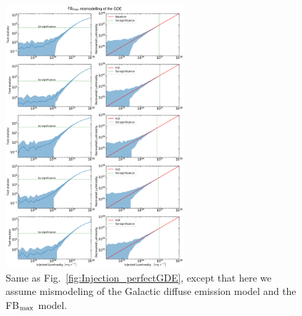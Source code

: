 \documentclass[doublespace,nopageskip]{VTthesis}
\begin{document}
\begin{figure}
    \begin{center}
    \includegraphics[width=0.6\textwidth]{Figures/CTA/all-TS-mis-True-Fermi-min-False.pdf}
    \caption{Same as Fig.~\ref{fig:Injection_perfectGDE}, except that here we assume mismodeling of the Galactic diffuse emission model and the FB$_{\rm max}$ model.}\label{fig:InjectionmismodelingFBmax}
    \end{center}
\end{figure}
\end{document}

